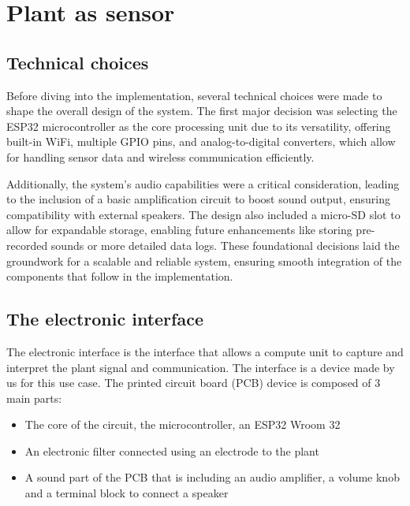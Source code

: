 \section{Plant as sensor}


\subsection{Technical choices}

Before diving into the implementation, several technical choices were made to shape the overall design of the system. The first major decision was selecting the ESP32 microcontroller as the core processing unit due to its versatility, offering built-in WiFi, multiple GPIO pins, and analog-to-digital converters, which allow for handling sensor data and wireless communication efficiently.

Additionally, the system's audio capabilities were a critical consideration, leading to the inclusion of a basic amplification circuit to boost sound output, ensuring compatibility with external speakers. The design also included a micro-SD slot to allow for expandable storage, enabling future enhancements like storing pre-recorded sounds or more detailed data logs. These foundational decisions laid the groundwork for a scalable and reliable system, ensuring smooth integration of the components that follow in the implementation.

\subsection{The electronic interface}

The electronic interface is the interface that allows a compute unit to capture and interpret the plant signal and
communication. The interface is a device made by us for this use case. The printed circuit board (PCB)
device is composed of 3 main parts:
\begin{itemize}
    \item The core of the circuit, the microcontroller, an ESP32 Wroom 32
    \item An electronic filter connected using an electrode to the plant
    \item A sound part of the PCB that is including an audio amplifier, a volume knob and a terminal block to connect a speaker
\end{itemize}

